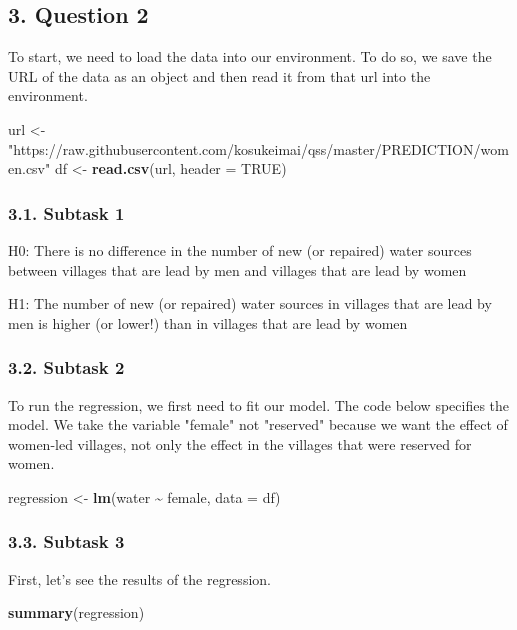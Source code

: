 \documentclass[
]{article}
\newenvironment{Shaded}{\begin{snugshade}}{\end{snugshade}}
\newcommand{\AttributeTok}[1]{\textcolor[rgb]{0.13,0.29,0.53}{#1}}
\newcommand{\ConstantTok}[1]{\textcolor[rgb]{0.56,0.35,0.01}{#1}}
\newcommand{\FunctionTok}[1]{\textcolor[rgb]{0.13,0.29,0.53}{\textbf{#1}}}
\newcommand{\NormalTok}[1]{#1}
\newcommand{\OtherTok}[1]{\textcolor[rgb]{0.56,0.35,0.01}{#1}}
\newcommand{\SpecialCharTok}[1]{\textcolor[rgb]{0.81,0.36,0.00}{\textbf{#1}}}
\newcommand{\StringTok}[1]{\textcolor[rgb]{0.31,0.60,0.02}{#1}}
\begin{document}
\subsection{3. Question 2}\label{question-2}
To start, we need to load the data into our environment. To do so, we save the URL of the data as an object and then read it from that url into the environment.
\begin{Shaded}
\begin{Highlighting}[]
\NormalTok{url }\OtherTok{\textless{}{-}} \StringTok{"https://raw.githubusercontent.com/kosukeimai/qss/master/PREDICTION/women.csv"}
\NormalTok{df }\OtherTok{\textless{}{-}} \FunctionTok{read.csv}\NormalTok{(url, }\AttributeTok{header =} \ConstantTok{TRUE}\NormalTok{)}
\end{Highlighting}
\end{Shaded}

\subsubsection{3.1. Subtask 1}\label{subtask-1}

H0: There is no difference in the number of new (or repaired) water sources between villages that are lead by men and villages that are lead by women

H1: The number of new (or repaired) water sources in villages that are lead by men is higher (or lower!) than in villages that are lead by women


\subsubsection{3.2. Subtask 2}\label{subtask-2}
To run the regression, we first need to fit our model. The code below specifies the model. We take the variable "female" not "reserved" because we want the effect of women-led villages, not only the effect in the villages that were reserved for women.
\begin{Shaded}
\begin{Highlighting}[]
\NormalTok{regression }\OtherTok{\textless{}{-}} \FunctionTok{lm}\NormalTok{(water }\SpecialCharTok{\textasciitilde{}}\NormalTok{ female, }\AttributeTok{data =}\NormalTok{ df)}
\end{Highlighting}
\end{Shaded}

\subsubsection{3.3. Subtask 3}\label{subtask-3}
First, let's see the results of the regression.
\begin{Shaded}
\begin{Highlighting}[]
\FunctionTok{summary}\NormalTok{(regression)}
\end{Highlighting}
\end{Shaded}
\end{document}
